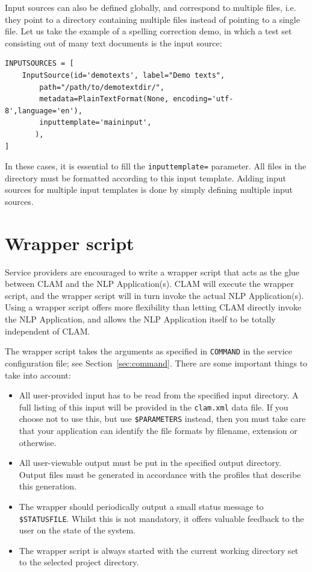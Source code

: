 \documentclass[a4paper,12pt]{report}
\begin{document}
Input sources can also be defined globally, and correspond to multiple files, i.e. they point to a directory containing multiple files instead of pointing to a single file. Let us take the example of a spelling correction demo, in which a test set consisting out of many text documents is the input source:

\begin{verbatim}
INPUTSOURCES = [
    InputSource(id='demotexts', label="Demo texts",
        path="/path/to/demotextdir/", 
        metadata=PlainTextFormat(None, encoding='utf-8',language='en'),
        inputtemplate='maininput',
       ),
]
\end{verbatim}

In these cases, it is essential to fill the \texttt{inputtemplate=} parameter. All files in the directory must be formatted according to this input template. Adding input sources for multiple input templates is done by simply defining multiple input sources. %


\section{Wrapper script}

Service providers are encouraged to write a wrapper script that acts as the glue between CLAM and the NLP Application(s). CLAM will execute the wrapper script, and the wrapper script will in turn invoke the actual NLP Application(s). Using a wrapper script offers more flexibility than letting CLAM directly invoke the NLP Application, and allows the NLP Application itself to be totally independent of CLAM. 

The wrapper script takes the arguments as specified in \texttt{COMMAND} in the service configuration file; see Section~\ref{sec:command}. There are some important things to take into account:

\begin{itemize}
\item All user-provided input has to be read from the specified input directory. A full listing of this input will be provided in the \texttt{clam.xml} data file. If you choose not to use this, but use \texttt{\$PARAMETERS} instead, then you must take care that your application can identify the file formats by filename, extension or otherwise.
\item All user-viewable output must be put in the specified output directory. Output files must be generated in accordance with the profiles that describe this generation. 
\item The wrapper should periodically output a small status message to \texttt{\$STATUSFILE}. Whilst this is not mandatory, it offers valuable feedback to the user on the state of the system. 
\item The wrapper script is always started with the current working directory set to the selected project directory.
\end{itemize}
\end{document}
